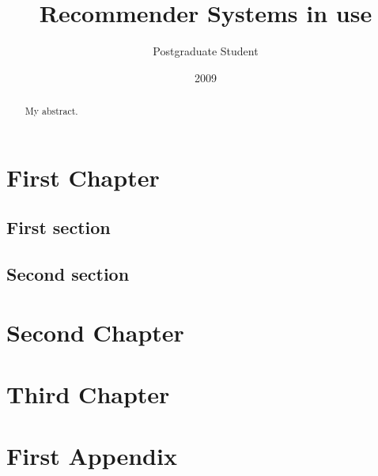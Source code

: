 \documentclass[10pt,twoside,openright]{report}
\title{Recommender Systems in use}
\author{Postgraduate Student}
\date{2009}
\begin{document}
\maketitle

\declaration

\dedication{To my ...}

\begin{abstract}
My abstract.
\end{abstract}

\tableofcontents

\chapter{First Chapter}

\section{First section}

\section{Second section}

\chapter{Second Chapter}

\chapter{Third Chapter}


\appendix

\chapter{First Appendix}
\end{document}

